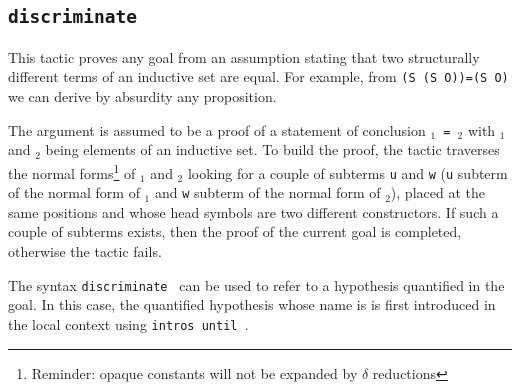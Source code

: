 \begin{coq_example*}

\subsection{\tt discriminate \term}
\label{discriminate}


This tactic proves any goal from an assumption stating that two
structurally different terms of an inductive set are equal. For
example, from {\tt (S (S O))=(S O)} we can derive by absurdity any
proposition.

The argument {\term} is assumed to be a proof of a statement
of conclusion {\tt{\term$_1$} = {\term$_2$}} with {\term$_1$} and
{\term$_2$} being elements of an inductive set.  To build the proof,
the tactic traverses the normal forms\footnote{Reminder: opaque
  constants will not be expanded by $\delta$ reductions} of
{\term$_1$} and {\term$_2$} looking for a couple of subterms {\tt u}
and {\tt w} ({\tt u} subterm of the normal form of {\term$_1$} and
{\tt w} subterm of the normal form of {\term$_2$}), placed at the same
positions and whose head symbols are two different constructors. If
such a couple of subterms exists, then the proof of the current goal
is completed, otherwise the tactic fails.

\Rem The syntax {\tt discriminate {\ident}} can be used to refer to a
hypothesis quantified in the goal. In this case, the quantified
hypothesis whose name is {\ident} is first introduced in the local
context using \texttt{intros until \ident}.


\end{coq_example*}
